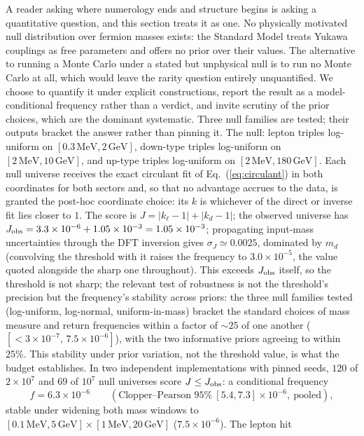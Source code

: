 \documentclass[11pt]{article}
\begin{document}
A reader asking where numerology ends and structure begins is asking a
quantitative question, and this section treats it as one. No physically
motivated null distribution over fermion masses exists: the Standard Model
treats Yukawa couplings as free parameters and offers no prior over their
values. The alternative to running a Monte Carlo under a stated but
unphysical null is to run no Monte Carlo at all, which would leave the
rarity question entirely unquantified. We choose to quantify it under
explicit constructions, report the result as a model-conditional frequency
rather than a verdict, and invite scrutiny of the prior choices, which are
the dominant systematic. Three null families are tested; their outputs
bracket the answer rather than pinning it. The null: lepton
triples log-uniform on $[0.3\,\mathrm{MeV}, 2\,\mathrm{GeV}]$, down-type
triples log-uniform on $[2\,\mathrm{MeV}, 10\,\mathrm{GeV}]$, and up-type
triples log-uniform on $[2\,\mathrm{MeV}, 180\,\mathrm{GeV}]$. Each null
universe receives the exact circulant fit of Eq.~(\ref{eq:circulant}) in both coordinates for both sectors and, so that no advantage accrues to the data, is granted the post-hoc coordinate choice: its $k$ is whichever of the
direct or inverse fit lies closer to $1$. The score is
$J = |k_\ell - 1| + |k_d - 1|$; the observed universe has
$J_{\rm obs} = 3.3\times10^{-6} + 1.05\times10^{-3} = 1.05\times10^{-3}$; propagating input-mass uncertainties through the DFT inversion gives $\sigma_J \simeq 0.0025$, dominated by $m_d$ (convolving the threshold with it raises the frequency to $3.0\times10^{-5}$, the value quoted alongside the sharp one throughout). This exceeds $J_{\rm obs}$ itself, so the threshold is not sharp; the relevant test of robustness is not the threshold's precision but the frequency's stability across priors: the three null families tested (log-uniform, log-normal, uniform-in-mass) bracket the standard choices of mass measure and return frequencies within a factor of $\sim 25$ of one another ($[{<}3\times10^{-7},\, 7.5\times10^{-6}]$), with the two informative priors agreeing to within $25\%$. This stability under prior variation, not the threshold value, is what the budget establishes. In two independent implementations with pinned seeds, $120$ of $2\times10^7$ and $69$ of $10^7$ null universes score $J \le J_{\rm obs}$: a conditional frequency
\begin{equation}
f = 6.3\times10^{-6}
\qquad (\text{Clopper--Pearson } 95\%\ [5.4, 7.3]\times10^{-6},\ \text{pooled}),
\end{equation}
stable under widening both mass windows to $[0.1\,\mathrm{MeV}, 5\,\mathrm{GeV}]\times[1\,\mathrm{MeV}, 20\,\mathrm{GeV}]$ ($7.5\times10^{-6}$). The lepton hit
\end{document}
